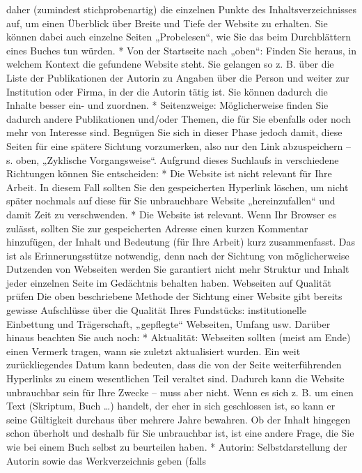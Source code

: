\documentclass[]{book}
\theoremstyle{definition}
\theoremstyle{definition}
\theoremstyle{definition}
\theoremstyle{remark}
\begin{document}
daher (zumindest stichprobenartig) die einzelnen Punkte des
Inhaltsverzeichnisses auf, um einen Überblick über Breite und Tiefe der
Website zu erhalten. Sie können dabei auch einzelne Seiten
„Probelesen``, wie Sie das beim Durchblättern eines Buches tun würden. *
Von der Startseite nach „oben``: Finden Sie heraus, in welchem Kontext
die gefundene Website steht. Sie gelangen so z. B. über die Liste der
Publikationen der Autorin zu Angaben über die Person und weiter zur
Institution oder Firma, in der die Autorin tätig ist. Sie können dadurch
die Inhalte besser ein- und zuordnen. * Seitenzweige: Möglicherweise
finden Sie dadurch andere Publikationen und/oder Themen, die für Sie
ebenfalls oder noch mehr von Interesse sind. Begnügen Sie sich in dieser
Phase jedoch damit, diese Seiten für eine spätere Sichtung vorzumerken,
also nur den Link abzuspeichern -- s. oben, „Zyklische Vorgangsweise``.
Aufgrund dieses Suchlaufs in verschiedene Richtungen können Sie
entscheiden: * Die Website ist nicht relevant für Ihre Arbeit. In diesem
Fall sollten Sie den gespeicherten Hyperlink löschen, um nicht später
nochmals auf diese für Sie unbrauchbare Website „hereinzufallen`` und
damit Zeit zu verschwenden. * Die Website ist relevant. Wenn Ihr Browser
es zulässt, sollten Sie zur gespeicherten Adresse einen kurzen Kommentar
hinzufügen, der Inhalt und Bedeutung (für Ihre Arbeit) kurz
zusammenfasst. Das ist als Erinnerungsstütze notwendig, denn nach der
Sichtung von möglicherweise Dutzenden von Webseiten werden Sie
garantiert nicht mehr Struktur und Inhalt jeder einzelnen Seite im
Gedächtnis behalten haben. Webseiten auf Qualität prüfen Die oben
beschriebene Methode der Sichtung einer Website gibt bereits gewisse
Aufschlüsse über die Qualität Ihres Fundstücks: institutionelle
Einbettung und Trägerschaft, „gepflegte`` Webseiten, Umfang usw. Darüber
hinaus beachten Sie auch noch: * Aktualität: Webseiten sollten (meist am
Ende) einen Vermerk tragen, wann sie zuletzt aktualisiert wurden. Ein
weit zurückliegendes Datum kann bedeuten, dass die von der Seite
weiterführenden Hyperlinks zu einem wesentlichen Teil veraltet sind.
Dadurch kann die Website unbrauchbar sein für Ihre Zwecke -- muss aber
nicht. Wenn es sich z. B. um einen Text (Skriptum, Buch \ldots{})
handelt, der eher in sich geschlossen ist, so kann er seine Gültigkeit
durchaus über mehrere Jahre bewahren. Ob der Inhalt hingegen schon
überholt und deshalb für Sie unbrauchbar ist, ist eine andere Frage, die
Sie wie bei einem Buch selbst zu beurteilen haben. * Autorin:
Selbstdarstellung der Autorin sowie das Werkverzeichnis geben (falls
\end{document}
